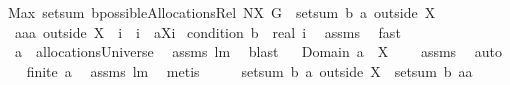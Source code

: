 \begin{isabellebody}
{\isachardoublequoteopen}Max\ {\isacharparenleft}{\isacharparenleft}setsum\ b{\isacharparenright}{\isacharbackquote}{\isacharparenleft}possibleAllocationsRel\ {\isacharparenleft}N{\isacharminus}X{\isacharparenright}\ G{\isacharparenright}{\isacharparenright}\ {\isasymge}\ setsum\ b\ {\isacharparenleft}a\ outside\ X{\isacharparenright}{\isachardoublequoteclose}\isanewline
%
\isadelimproof
%
\endisadelimproof
%
\isatagproof
{}\isamarkupfalse%
\ {\isacharminus}\isanewline
{}\isamarkupfalse%
\ {\isacharquery}aa{\isacharequal}{\isachardoublequoteopen}a\ outside\ {\isacharparenleft}X\ {\isasymunion}\ {\isacharbraceleft}i{\isacharbraceright}{\isacharparenright}\ {\isasymunion}\ {\isacharparenleft}{\isacharbraceleft}i{\isacharbraceright}\ {\isasymtimes}\ {\isacharbraceleft}{\isasymUnion}{\isacharparenleft}a{\isacharbackquote}{\isacharbackquote}{\isacharparenleft}X{\isasymunion}{\isacharbraceleft}i{\isacharbraceright}{\isacharparenright}{\isacharparenright}{\isacharbraceright}{\isacharparenright}{\isachardoublequoteclose}\isanewline
{}\isamarkupfalse%
\ {\isachardoublequoteopen}condition{}\ {\isacharparenleft}b{\isacharcolon}{\isacharcolon}{\isacharunderscore}\ {\isacharequal}{\isachargreater}\ real{\isacharparenright}\ i{\isachardoublequoteclose}\ \isamarkupfalse%
\ assms{\isacharparenleft}{}{\isacharparenright}\ \isamarkupfalse%
\ fast\isanewline
{}\isamarkupfalse%
\ \isamarkupfalse%
\ {\isachardoublequoteopen}a\ {\isasymin}\ allocationsUniverse{\isachardoublequoteclose}\ \isamarkupfalse%
\ assms{\isacharparenleft}{}{\isacharparenright}\ lm{}{}\ \isamarkupfalse%
\ blast\isanewline
{}\isamarkupfalse%
\ \isamarkupfalse%
\ {\isachardoublequoteopen}Domain\ a\ {\isasyminter}\ X\ {\isasymnoteq}\ {\isacharbraceleft}{\isacharbraceright}{\isachardoublequoteclose}\ \isamarkupfalse%
\ assms{\isacharparenleft}{}{\isacharparenright}\ \isamarkupfalse%
\ auto\isanewline
{}\isamarkupfalse%
\ \isamarkupfalse%
\ {\isachardoublequoteopen}finite\ a{\isachardoublequoteclose}\ \isamarkupfalse%
\ assms\ lm{}{}\ \isamarkupfalse%
\ metis\ \isamarkupfalse%
\ \isamarkupfalse%
\ \isanewline
{}{\isacharcolon}\ {\isachardoublequoteopen}setsum\ b\ {\isacharparenleft}a\ outside\ X{\isacharparenright}\ {\isasymle}\ setsum\ b\ {\isacharquery}aa{\isachardoublequoteclose}\ \isamarkupfalse%

\end{isabellebody}
